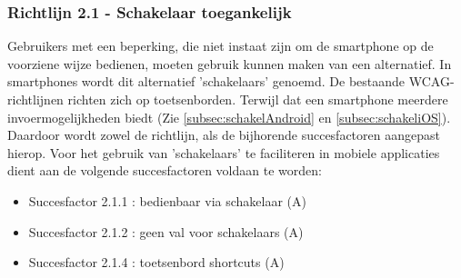 \subsubsection{Richtlijn 2.1 - Schakelaar toegankelijk}
Gebruikers met een beperking, die niet instaat zijn om de smartphone op de voorziene wijze bedienen, moeten gebruik kunnen maken van een alternatief. In smartphones wordt dit alternatief 'schakelaars' genoemd. De bestaande WCAG-richtlijnen richten zich op toetsenborden. Terwijl dat een smartphone meerdere invoermogelijkheden biedt (Zie \ref{subsec:schakelAndroid} en \ref{subsec:schakeliOS}). Daardoor wordt zowel de richtlijn, als de bijhorende succesfactoren aangepast hierop. Voor het gebruik van 'schakelaars' te faciliteren in mobiele applicaties dient aan de volgende succesfactoren voldaan te worden: \begin{itemize}
    \item Succesfactor 2.1.1 : bedienbaar via schakelaar (A)
    \item Succesfactor 2.1.2 : geen val voor schakelaars (A)
    
    \item Succesfactor 2.1.4 : toetsenbord shortcuts (A)
\end{itemize}
